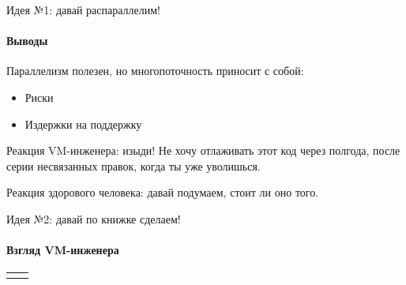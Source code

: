 \begin{frame}[t]{Идея №1: давай распараллелим!}
\framesubtitle{Выводы}

Параллелизм полезен, но многопоточность приносит с собой:
\begin{itemize}
  \item Риски
  \item Издержки на поддержку
\end{itemize}

\pause
Реакция VM-инженера: изыди! Не хочу отлаживать этот код через полгода, после серии несвязанных правок, когда ты уже уволишься.

\pause
Реакция здорового человека: давай подумаем, стоит ли оно того.

\end{frame}


\begin{frame}[t]{Идея №2: давай по книжке сделаем!}
\framesubtitle{Взгляд VM-инженера}

\begin{tabular}{p{} p{}}  
\centering{Реальность} & 
\end{tabular}


\end{frame}


